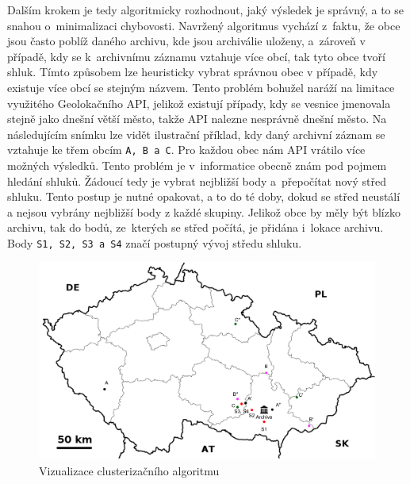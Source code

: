 \newpara 
Dalším krokem je tedy algoritmicky rozhodnout, jaký výsledek je správný, a to se snahou o~minimalizaci chybovosti. Navržený algoritmus vychází z~faktu, že obce jsou často poblíž daného archivu, kde jsou archiválie uloženy, a~zároveň v případě, kdy se k~archivnímu záznamu vztahuje více obcí, tak tyto obce tvoří shluk. Tímto způsobem lze heuristicky vybrat správnou obec v případě, kdy existuje více obcí se stejným názvem. Tento problém bohužel naráží na limitace využitého Geolokačního API, jelikož existují případy, kdy se vesnice jmenovala stejně jako dnešní větší město, takže API nalezne nesprávně dnešní město. Na následujícím snímku lze vidět ilustrační příklad, kdy daný archivní záznam se vztahuje ke třem obcím \texttt{A, B a C}. Pro každou obec nám API vrátilo více možných výsledků. Tento problém je v~informatice obecně znám pod pojmem hledání shluků. Žádoucí tedy je vybrat nejbližší body a~přepočítat nový střed shluku. Tento postup je nutné opakovat, a to do té doby, dokud se střed neustálí a nejsou vybrány nejbližší body z každé skupiny. Jelikož obce by měly být blízko archivu, tak do bodů, ze~kterých se střed počítá, je přidána i~lokace archivu. Body \texttt{S1, S2, S3 a S4} značí postupný vývoj středu shluku.

\newpage

\begin{figure}[htbp]
    \centering
        \includegraphics[scale=.6]{obrazky-figures/implementation/location_algorithm_explanation.pdf}
        \caption{Vizualizace clusterizačního algoritmu\protect\footnotemark}
\end{figure}


